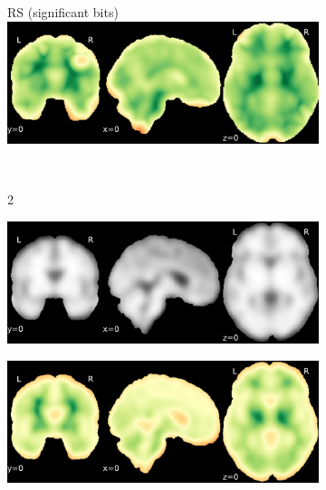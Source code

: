 \documentclass{article}
\begin{document}
\begin{appendices}
\begin{landscape}
\begin{figure}
\begin{subfigure}[t]{0.2\paperheight}
            \end{subfigure}
            \begin{subfigure}[t]{0.2\paperheight}
                \centering
                RS (significant bits)
                \includegraphics[width=\textwidth]{figures/sig/15mm/rs_ds001600_sub-1_sig.pdf}
            \end{subfigure} \\
            \begin{subfigure}[b][][c]{0.01\paperwidth} 2 \vspace*{15pt} \end{subfigure}
            \begin{subfigure}[t]{0.2\paperheight}
                \centering
                \includegraphics[width=\textwidth]{figures/sig/15mm/ieee_ds001771_sub-36.pdf}
            \end{subfigure}
            \begin{subfigure}[t]{0.2\paperheight}
                \centering
                \includegraphics[width=\textwidth]{figures/sig/15mm/rr_ds001771_sub-36_sig.pdf}

\end{subfigure}
\end{figure}
\end{landscape}
\end{appendices}
\end{document}
